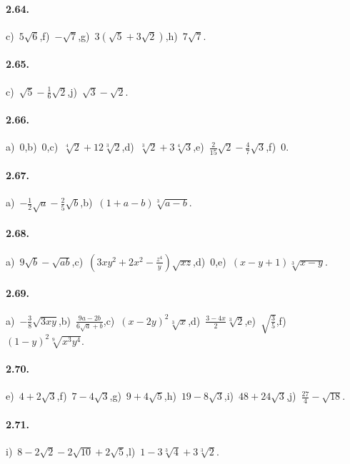 \paragraph{2.64.}
c)~$5\sqrt 6$,\quad f)~$-\sqrt 7$,\quad g)~$3(\sqrt 5+3\sqrt 2)$,\quad h)~$7\sqrt 7$.

\paragraph{2.65.}
c)~$\sqrt 5-\frac 1 6\sqrt 2$,\quad j)~$\sqrt 3-\sqrt 2$.

\paragraph{2.66.}
a)~$0$,\quad b)~$0$,\quad c)~$\sqrt[4]2+12\sqrt[3]2$,\quad d)~$\sqrt[3]2+3\sqrt[4]3$,\quad e)~$\frac 2{15}\sqrt 2-\frac 4 7\sqrt 3$,\quad f)~$0$.

\paragraph{2.67.}
a)~$-\frac 1 2\sqrt a-\frac 2 5\sqrt b$,\quad b)~$(1+a-b)\sqrt[3]{a-b}$.

\paragraph{2.68.}
a)~$9\sqrt b-\sqrt{ab}$,\quad c)~$\left(3xy^2+2x^2-\frac{z^4}{y}\right)\sqrt{xz}$,\quad d)~$0$,\quad e)~$(x-y+1)\sqrt[3]{x-y}$.

\paragraph{2.69.}
a)~$-\frac{3}{8}\sqrt{3xy}$,\quad b)~$\frac{9a-2b}{6\sqrt{a}+b}$,\quad c)~$(x-2y)^2\sqrt[3]{x}$,\quad d)~$\frac{3-4x}{2}\sqrt[3]{2}$,\quad e)~$\sqrt{\frac{3}{5}}$,\quad f)~$(1-y)^2\sqrt[9]{x^3y^4}$.

\paragraph{2.70.}
e)~$4+2\sqrt 3$,\quad f)~$7-4\sqrt 3$,\quad g)~$9+4\sqrt 5$,\quad h)~$19-8\sqrt 3$,\quad i)~$48+24\sqrt 3$,\quad j)~$\frac{27} 4-\sqrt{18}$.

\paragraph{2.71.}
i)~$8-2\sqrt 2-2\sqrt{10}+2\sqrt 5$,\quad l)~$1-3\sqrt[3]4+3\sqrt[3]2$.

